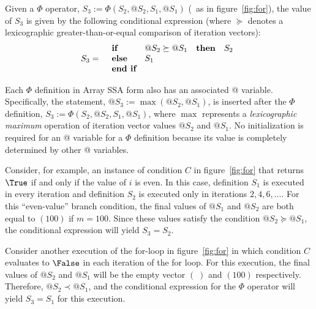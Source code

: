 Given a $\Phi$ operator,
$S_3 := \Phi(S_2, @S_2, S_1, @S_1)$ (\eg\ as in figure~\ref{fig:for}), 
the value of $S_3$ is given by the following 
conditional expression (where $\succeq$ denotes a lexicographic greater-than-or-equal
comparison of iteration vectors):
\begin{eqnarray*}
S_3 & = &
  \begin{array}{llll}
\mbox{\bf if} & @S_2 \succeq @S_1 & {\bf then} & S_2 \\
\mbox{\bf else} & S_1 \\
\mbox{\bf end if} 
  \end{array}
\end{eqnarray*}

Each $\Phi$ definition in Array SSA form also has an associated @ variable.
Specifically, the statement, $@S_3 := \max(@S_2,
@S_1)$, is inserted after the
$\Phi$ definition, $S_3 := \Phi(S_2, @S_2, S_1, @S_1)$, where $\max$ represents a {\it lexicographic maximum}
operation of iteration vector values $@S_2$ and $@S_1$.
No initialization is required
for an @ variable for a $\Phi$ definition
because its value is completely determined by other @ variables.

Consider, for example, an instance of condition $C$ in figure~\ref{fig:for} that returns $\True$ if and only if the value of $i$ is even.
In this case, definition $S_1$ is executed in every iteration
and definition $S_2$ is executed only in iterations $2, 4, 6, \ldots$.
For this ``even-value'' branch condition, the final values of $@S_1$ and $@S_2$ are both equal to
$(100)$ if $m=100$.  Since these values satisfy the condition
$@S_2 \succeq @S_1$, 
the conditional expression will yield $S_3 = S_2$.

Consider another execution of the for-loop in figure~\ref{fig:for} in
which condition $C$ evaluates to $\False$ in each iteration of the for
loop.  For this execution, the final values of $@S_2$ and $@S_1$ will be
the empty vector $(\;)$ and $(100)$ respectively.  Therefore, 
$@S_2 \prec @S_1$, and the conditional expression for the
$\Phi$ operator will yield $S_3 = S_1$
for this execution.



